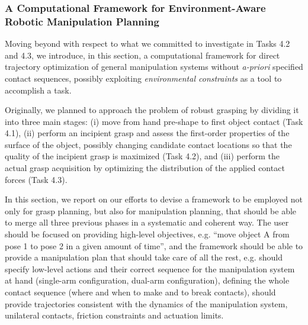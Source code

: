 
\subsubsection{A Computational Framework for Environment-Aware Robotic Manipulation Planning}
\label{sec:ComputationalFramework}


Moving beyond with respect to what we committed to investigate in Tasks 4.2 and 4.3, we introduce, in this section, a computational framework for direct trajectory optimization of general manipulation systems without \textsl{a-priori} specified contact sequences, possibly exploiting \emph{environmental constraints} as a tool to accomplish a task.

 Originally, we planned to approach the problem of robust grasping by dividing it into three main stages: (i) move from hand pre-shape to first object contact (Task 4.1), (ii) perform an incipient grasp and assess the first-order properties of the surface of the object, possibly changing candidate contact locations so that the quality of the incipient grasp is maximized (Task 4.2), and (iii) perform the actual grasp acquisition by optimizing the distribution of the applied contact forces (Task 4.3).

 In this section, we report on our efforts to devise a framework to be employed not only for grasp planning, but also for manipulation planning, that should be able to merge all three previous phases in a systematic and coherent way. The user should be focused on providing high-level objectives, e.g. ``move object A from pose 1 to pose 2 in a given amount of time'', and the framework should be able to provide a manipulation plan that should take care of all the rest, e.g. should specify low-level actions and their correct sequence for the manipulation system at hand (single-arm configuration, dual-arm configuration),  defining the whole contact sequence (where and when to make and to break contacts), should provide trajectories consistent with the dynamics of the manipulation system, unilateral contacts, friction constraints and actuation limits.

